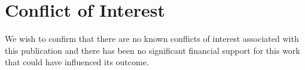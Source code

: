 \documentclass[preprint,12pt, a4paper]{elsarticle}
\begin{document}
\section{Conflict of Interest}

We wish to confirm that there are no known conflicts of interest associated with this publication and there has been no significant financial support for this work that could have influenced its outcome.



\end{document}
